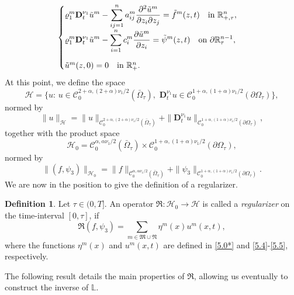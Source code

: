 \documentclass[reqno]{amsart}
\def\C {\mathcal{C}}
\theoremstyle{definition}
\newtheorem{definition}[proposition]{Definition}
\numberwithin{equation}{section}
\begin{document}
\begin{equation}
\label{5.5}
\begin{cases}
\displaystyle\varrho_{1}^{m}\mathbf{D}_{t}^{\nu_{1}}\tilde{u}^{m}-\sum_{ij=1}^{n}a_{ij}^{m}\frac{\partial^{2}\tilde{u}^{m}}{\partial
z_{i}\partial z_{j}}=\tilde{f}^{m}(z,t)\quad \text{in }
\mathbb{R}^{n}_{+,\tau},\\
\displaystyle\varrho_{1}^{m}\mathbf{D}_{t}^{\nu_{1}}\tilde{u}^{m}-\sum\limits_{i=1}^{n}c_{i}^{m}\frac{\partial\tilde{u}^{m}}{\partial
z_{i}}=\tilde{\psi}^{m}(z,t)\quad \text{on }
\partial\mathbb{R}^{n-1}_{\tau},\\
\noalign{\vskip3mm}
\tilde{u}^{m}(z,0)=0 \quad \text{in }
\mathbb{R}^{n}_{+}.
\end{cases}
\end{equation}
At this point, we define the space
$$\mathcal{H}=\big\{u:\, u\in\C_{0}^{2+\alpha,(2+\alpha)\nu_{1}/2}(\bar{\Omega}_{\tau}),\,\, \mathbf{D}^{\nu_{1}}_{t}u\in\C_{0}^{1+\alpha,(1+\alpha)\nu_{1}/2}(\partial\Omega_{\tau})\big\},$$
normed by
$$\|u\|_{\mathcal{H}}=\|u\|_{\C_{0}^{2+\alpha,(2+\alpha)\nu_{1}/2}(\bar{\Omega}_{\tau})}+
\| \mathbf{D}^{\nu_{1}}_{t}u\|_{\C_{0}^{1+\alpha,(1+\alpha)\nu_{1}/2}(\partial\Omega_{\tau})},$$
together with the product space
$$\mathcal{H}_{0}=\C_{0}^{\alpha,\alpha\nu_{1}/2}(\bar{\Omega}_{\tau})\times \C_{0}^{1+\alpha,(1+\alpha)\nu_{1}/2}(\partial\Omega_{\tau}),$$
normed by
$$\|(f,\psi_3)\|_{\mathcal{H}_0}=\|f\|_{\C_{0}^{\alpha,\alpha\nu_{1}/2}(\bar{\Omega}_{\tau})}+
\| \psi_3\|_{\C_{0}^{1+\alpha,(1+\alpha)\nu_{1}/2}(\partial\Omega_{\tau})}.$$
We are now in the position to give the definition of a regularizer.

\begin{definition}\label{d5.1}
Let $\tau\in(0,T]$.
An operator $\mathfrak{R}:\mathcal{H}_{0}\to\mathcal{H}$ is called a \textit{regularizer} on the time-interval $[0,\tau]$, if
\begin{equation*}
\mathfrak{R}(f,\psi_{3})=\sum_{m\in\mathfrak{M}\cup\mathfrak{N}}\eta^{m}(x)u^{m}(x,t),
\end{equation*}
where the functions $\eta^{m}(x)$ and $u^{m}(x,t)$ are defined
in \eqref{5.0*} and \eqref{5.4}-\eqref{5.5}, respectively.
\end{definition}

The following result details the main properties of
$\mathfrak{R}$, allowing us eventually to construct the inverse of $\mathbb{L}$.
\end{document}
